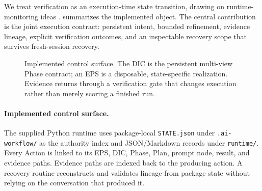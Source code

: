 \documentclass{article}
\begin{document}
We treat verification as an execution-time state transition, drawing on runtime-monitoring ideas \citep{leucker2009runtime}.  summarizes the implemented object. The central contribution is the joint execution contract: persistent intent, bounded refinement, evidence lineage, explicit verification outcomes, and an inspectable recovery scope that survives fresh-session recovery.

\begin{figure}[t]
\centering
{}
\caption{Implemented control surface. The DIC is the persistent multi-view Phase contract; an EPS is a disposable, state-specific realization. Evidence returns through a verification gate that changes execution rather than merely scoring a finished run.}
\label{fig:architecture}
\end{figure}

\paragraph{Implemented control surface.}
The supplied Python runtime uses package-local \texttt{STATE.json} under \texttt{.ai-workflow/} as the authority index and JSON/Markdown records under \texttt{runtime/}. Every Action is linked to its EPS, DIC, Phase, Plan, prompt node, result, and evidence paths. Evidence paths are indexed back to the producing action. A recovery routine reconstructs and validates lineage from package state without relying on the conversation that produced it.
\end{document}
